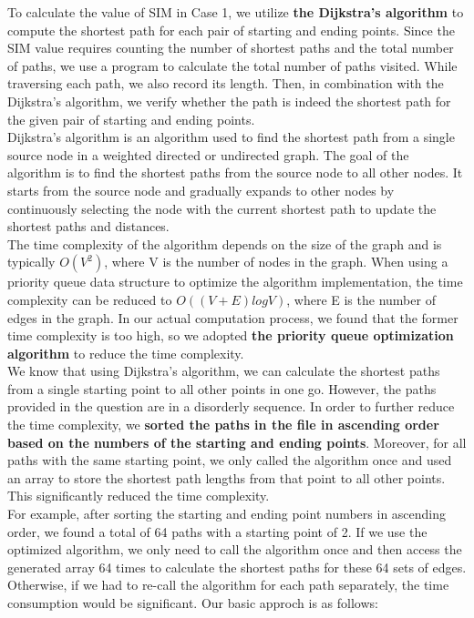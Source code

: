 \indent\indent To calculate the value of SIM in Case 1, we utilize \textbf{the Dijkstra's algorithm} to compute the shortest path for each pair of starting and ending points. Since the SIM value requires counting the number of shortest paths and the total number of paths, we use a program to calculate the total number of paths visited. While traversing each path, we also record its length. Then, in combination with the Dijkstra's algorithm, we verify whether the path is indeed the shortest path for the given pair of starting and ending points. \\
\indent Dijkstra's algorithm is an algorithm used to find the shortest path from a single source node in a weighted directed or undirected graph. The goal of the algorithm is to find the shortest paths from the source node to all other nodes. It starts from the source node and gradually expands to other nodes by continuously selecting the node with the current shortest path to update the shortest paths and distances.\\
\indent The time complexity of the algorithm depends on the size of the graph and is typically $O(V^2)$, where V is the number of nodes in the graph. When using a priority queue data structure to optimize the algorithm implementation, the time complexity can be reduced to $O((V + E)logV)$, where E is the number of edges in the graph. In our actual computation process, we found that the former time complexity is too high, so we adopted \textbf{the priority queue optimization algorithm} to reduce the time complexity.\\
\indent We know that using Dijkstra's algorithm, we can calculate the shortest paths from a single starting point to all other points in one go. However, the paths provided in the question are in a disorderly sequence. In order to further reduce the time complexity, we \textbf{sorted the paths in the file in ascending order based on the numbers of the starting and ending points}. Moreover, for all paths with the same starting point, we only called the algorithm once and used an array to store the shortest path lengths from that point to all other points. This significantly reduced the time complexity.\\
\indent For example, after sorting the starting and ending point numbers in ascending order, we found a total of 64 paths with a starting point of 2. If we use the optimized algorithm, we only need to call the algorithm once and then access the generated array 64 times to calculate the shortest paths for these 64 sets of edges. Otherwise, if we had to re-call the algorithm for each path separately, the time consumption would be significant. Our basic approch is as follows:\\
